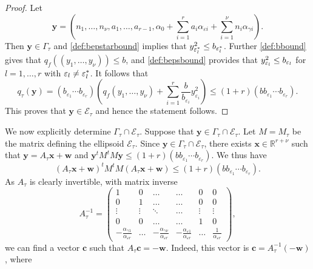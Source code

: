 \begin{proof}
Let 
\[\mathbf{y} = \left(n_1, \dots, n_{\nu}, a_1, \dots, a_{r-1}, \alpha_0+\sum_{i = 1}^r a_i \alpha_{\varepsilon i} + \sum_{i = 1}^{\nu} n_i \alpha_{\gamma i}\right).\]
Then $\mathbf{y} \in \Gamma_\tau$ and \eqref{def:bepstarbound} implies that $y_{\varepsilon_l^*}^2\leq b_{\varepsilon_l^*}$. Further \eqref{def:bbound} gives that $q_f((y_1, \dots, y_{\nu}))\leq b$, and \eqref{def:bepsbound} provides that $y_{\varepsilon_l}^2\leq b_{\varepsilon_l}$ for $l = 1, \dots, r$ with $\varepsilon_l \neq \varepsilon_l^*$. It follows that 
\[q_\tau(\mathbf{y}) = (b_{\varepsilon_1}\cdots b_{\varepsilon_r})\left( q_f(y_1, \dots, y_{\nu}) + \sum_{i = 1}^r\frac{b}{b_{\varepsilon_i}}y_{\varepsilon_i}^2\right) \leq (1+r)(bb_{\varepsilon_1}\cdots b_{\varepsilon_r}).\]
This proves that $\mathbf{y}\in\mathcal E_\tau$ and hence the statement follows.
\end{proof}
%
We now explicitly determine $ \Gamma_\tau\cap \mathcal E_\tau$. Suppose that $\mathbf{y}\in \Gamma_\tau\cap \mathcal E_\tau$. Let $M=M_\tau$ be the matrix defining the ellipsoid $\mathcal{E}_{\tau}$. 	
Since $\mathbf{y}\in \Gamma_\tau\cap \mathcal E_\tau$, there exists $\mathbf{x}\in \mathbb{R}^{r + \nu}$ such that $\mathbf{y}= A_\tau \mathbf{x}+\mathbf{w}$ and ${\mathbf{y}^tM^tM\mathbf{y}\leq (1 + r)(bb_{\varepsilon_1}\cdots b_{\varepsilon_r})}$. We thus have
\[(A_\tau \mathbf{x}+\mathbf{w})^tM^tM(A_\tau \mathbf{x}+\mathbf{w}) \leq (1 + r)(bb_{\varepsilon_1}\cdots b_{\varepsilon_r}).\]
As $A_{\tau}$ is clearly invertible, with matrix inverse
\[A_{\tau}^{-1} = \begin{pmatrix}
	1 & 0 & \dots &  \dots & 0 & 0\\ 
	0 & 1	& \dots & \dots & 0 & 0\\
	\vdots & \vdots & \ddots & \dots & \vdots & \vdots \\ 
	0 & 0 & \dots &  \dots & 1 & 0\\ 
	-\frac{\alpha_{\gamma 1}}{\alpha_{\varepsilon {r}}} & \dots &-\frac{\alpha_{\gamma {\nu}}}{\alpha_{\varepsilon {r}}} & -\frac{\alpha_{\varepsilon 1}}{\alpha_{\varepsilon {r}}} & \dots & \frac{1}{\alpha_{\varepsilon {r}}}
\end{pmatrix},\]
we can find a vector $\mathbf{c}$ such that $A_{\tau}\mathbf{c} = -\mathbf{w}$. Indeed, this vector is $\mathbf{c} = A_{\tau}^{-1}(-\mathbf{w})$, where
